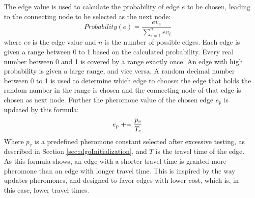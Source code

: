 The edge value is used to calculate the probability of edge $e$ to be chosen, leading to the connecting node to be selected as the next node: 
\newline
$$Probability(e) = \frac{ev_e}{\sum\limits^{n}_{i=1}ev_i}$$
\newline
where $ev$ is the edge value and $n$ is the number of possible edges. Each edge is given a range between 0 to 1 based on the calculated probability. Every real number between 0 and 1 is covered by a range exactly once. An edge with high probability is given a large range, and vice versa. A random decimal number between 0 to 1 is used to determine which edge to choose: the edge that holds the random number in the range is chosen and the connecting node of that edge is chosen as next node. Further the pheromone value of the chosen edge $e_p$ is updated by this formula:
\newline
$$e_p \mathrel{+}= \frac{p_v}{T_e}$$ 
\newline
Where $p_v$ is a predefined pheromone constant selected after excessive testing, as described in Section \vref{sec:algoInitialization}, and $T$ is the travel time of the edge. As this formula shows, an edge with a shorter travel time is granted more pheromone than an edge with longer travel time. This is inspired by the way \citet{hsiao04} updates pheromones, and designed to favor edges with lower cost, which is, in this case, lower travel times. 